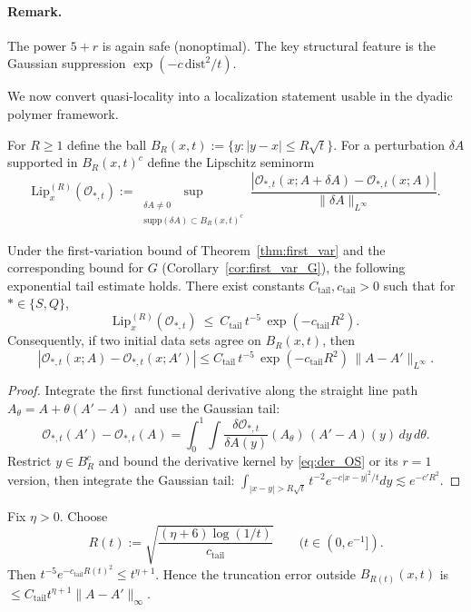 \paragraph{Remark.}
The power $5+r$ is again safe (nonoptimal). The key structural feature is the Gaussian suppression $\exp(-c\,\mathrm{dist}^2/t)$.

We now convert quasi-locality into a localization statement usable in the dyadic polymer framework.

\begin{definition}\label{def:Rt}
For $R\ge 1$ define the ball $B_R(x,t):=\{y:|y-x|\le R\sqrt t\}$.
For a perturbation $\delta A$ supported in $B_R(x,t)^c$ define the Lipschitz seminorm
\[
\mathrm{Lip}^{(R)}_x(\mathcal O_{*,t})
:=
\sup_{\substack{\delta A\neq 0\\ \mathrm{supp}(\delta A)\subset B_R(x,t)^c}}
\frac{|\mathcal O_{*,t}(x;A+\delta A)-\mathcal O_{*,t}(x;A)|}{\|\delta A\|_{L^\infty}}.
\]
\end{definition}

\begin{theorem}\label{thm:tail_R}
Under the first-variation bound of Theorem~\ref{thm:first_var} and the corresponding bound for $G$ (Corollary~\ref{cor:first_var_G}),
the following exponential tail estimate holds.
There exist constants $C_{\mathrm{tail}},c_{\mathrm{tail}}>0$ such that for $*\in\{S,Q\}$,
\[
\mathrm{Lip}^{(R)}_x(\mathcal O_{*,t})\ \le\ C_{\mathrm{tail}}\,t^{-5}\,\exp(-c_{\mathrm{tail}}R^2).
\]
Consequently, if two initial data sets agree on $B_R(x,t)$, then
\[
|\mathcal O_{*,t}(x;A)-\mathcal O_{*,t}(x;A')|
\le C_{\mathrm{tail}}\,t^{-5}\,\exp(-c_{\mathrm{tail}}R^2)\,\|A-A'\|_{L^\infty}.
\]
\end{theorem}

\begin{proof}
Integrate the first functional derivative along the straight line path $A_\theta=A+\theta(A'-A)$ and use the Gaussian tail:
\[
\mathcal O_{*,t}(A')-\mathcal O_{*,t}(A)=\int_0^1 \int \frac{\delta \mathcal O_{*,t}}{\delta A(y)}(A_\theta)\,(A'-A)(y)\,dy\,d\theta.
\]
Restrict $y\in B_R^c$ and bound the derivative kernel by \eqref{eq:der_OS} or its $r=1$ version, then integrate the Gaussian tail:
$\int_{|x-y|>R\sqrt t} t^{-2}e^{-c|x-y|^2/t}dy\lesssim e^{-c'R^2}$.
\end{proof}

\begin{corollary}\label{cor:R_choice}
Fix $\eta>0$. Choose
\[
R(t):=\sqrt{\frac{(\eta+6)\log(1/t)}{c_{\mathrm{tail}}}}\qquad (t\in(0,e^{-1}]).
\]
Then $t^{-5}e^{-c_{\mathrm{tail}}R(t)^2}\le t^{\eta+1}$.
Hence the truncation error outside $B_{R(t)}(x,t)$ is $\le C_{\mathrm{tail}} t^{\eta+1}\|A-A'\|_\infty$.
\end{corollary}

